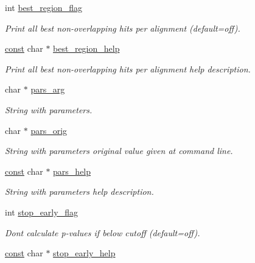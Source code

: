 \begin{DoxyCompactItemize}
int \hyperlink{structgengetopt__args__info_a4ee2d5172359ee7a6b7fd042fae11817}{best\+\_\+region\+\_\+flag}
\begin{DoxyCompactList}\small\item\em Print all best non-\/overlapping hits per alignment (default=off). \end{DoxyCompactList}\item 
\hyperlink{getopt_8c_a2c212835823e3c54a8ab6d95c652660e}{const} char $\ast$ \hyperlink{structgengetopt__args__info_a8943d1adc6dc6a89790adb4ce383943e}{best\+\_\+region\+\_\+help}
\begin{DoxyCompactList}\small\item\em Print all best non-\/overlapping hits per alignment help description. \end{DoxyCompactList}\item 
char $\ast$ \hyperlink{structgengetopt__args__info_a965c61281e9339738647ff5e44604d8b}{pars\+\_\+arg}
\begin{DoxyCompactList}\small\item\em String with parameters. \end{DoxyCompactList}\item 
char $\ast$ \hyperlink{structgengetopt__args__info_a2c6837447e74b77af713002cdb58949b}{pars\+\_\+orig}
\begin{DoxyCompactList}\small\item\em String with parameters original value given at command line. \end{DoxyCompactList}\item 
\hyperlink{getopt_8c_a2c212835823e3c54a8ab6d95c652660e}{const} char $\ast$ \hyperlink{structgengetopt__args__info_aacd28fcc4238ef2516cca7526df79533}{pars\+\_\+help}
\begin{DoxyCompactList}\small\item\em String with parameters help description. \end{DoxyCompactList}\item 
int \hyperlink{structgengetopt__args__info_aa4b8393ab6c37bca14cb1b291b5871df}{stop\+\_\+early\+\_\+flag}
\begin{DoxyCompactList}\small\item\em Don\textquotesingle{}t calculate p-\/values if below cutoff (default=off). \end{DoxyCompactList}\item 
\hyperlink{getopt_8c_a2c212835823e3c54a8ab6d95c652660e}{const} char $\ast$ \hyperlink{structgengetopt__args__info_aefd3bdbabef305d8e53741dc229e7cb0}{stop\+\_\+early\+\_\+help}

\end{DoxyCompactItemize}
